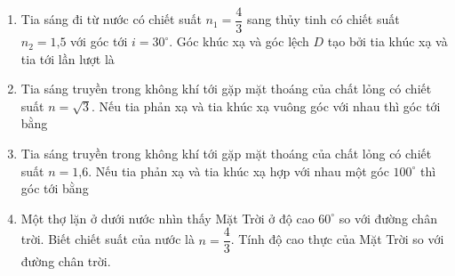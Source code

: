 \begin{enumerate}
{
	}
	\item{Tia sáng đi từ nước có chiết suất $n_1 = \dfrac{4}{3}$ sang thủy tinh có chiết suất $n_2 = \text{1,5}$ với góc tới $i = 30^\circ$. Góc khúc xạ và góc lệch $D$ tạo bởi tia khúc xạ và tia tới lần lượt là
	}
	\item{Tia sáng truyền trong không khí tới gặp mặt thoáng của chất lỏng có chiết suất $n =\sqrt 3$. Nếu tia phản xạ và tia khúc xạ vuông góc với nhau thì góc tới bằng 
	}
	\item{Tia sáng truyền trong không khí tới gặp mặt thoáng của chất lỏng có chiết suất $n = \text{1,6}$. Nếu tia phản xạ và tia khúc xạ hợp với nhau một góc $100^\circ$ thì góc tới bằng
	}
	\item{Một thợ lặn ở dưới nước nhìn thấy Mặt Trời ở độ cao $60^\circ$ so với đường chân trời. Biết chiết suất của nước là $n = \dfrac{4}{3}$. Tính độ cao thực của Mặt Trời so với đường chân trời.
		}
\end{enumerate}
